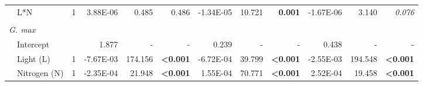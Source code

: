 \begin{landscape}
\begin{table}[]
{\begin{tabular}{p{0.5cm}p{2.5cm}p{0.5cm}p{2cm}p{1.5cm}p{1.5cm}p{2cm}p{1.5cm}p{1.5cm}p{2cm}p{1.5cm}p{1.5cm}}
         & L*N
         & \multicolumn{1}{r}{1}
         & \multicolumn{1}{r}{3.88E-06}
         & \multicolumn{1}{r}{0.485}
         & \multicolumn{1}{r}{0.486}
         & \multicolumn{1}{r}{-1.34E-05}
         & \multicolumn{1}{r}{10.721}
         & \multicolumn{1}{r}{\textbf{0.001}}
         & \multicolumn{1}{r}{-1.67E-06}
         & \multicolumn{1}{r}{3.140}
         & \multicolumn{1}{r}{\textit{0.076}}                 
         \\ &&&&&&&&&& \\ 
         
         \multicolumn{2}{l}{\textit{G. max}} &&&&&&&&&& \\
         & Intercept 
         && \multicolumn{1}{r}{1.877}               
         & \multicolumn{1}{r}{-}                                 
         & \multicolumn{1}{r}{-}                     
         & \multicolumn{1}{r}{0.239}                
         & \multicolumn{1}{r}{-}                                 
         & \multicolumn{1}{r}{-}  
         & \multicolumn{1}{r}{0.438}                
         & \multicolumn{1}{r}{-}                                 
         & \multicolumn{1}{r}{-} \\
         
         & Light (L) 
         & \multicolumn{1}{r}{1}
         & \multicolumn{1}{r}{-7.67E-03}            
         & \multicolumn{1}{r}{174.156}                           
         & \multicolumn{1}{r}{\textbf{\textless{}0.001}}      
         & \multicolumn{1}{r}{-6.72E-04}            
         & \multicolumn{1}{r}{39.799}
         & \multicolumn{1}{r}{\textbf{\textless{}0.001}}
         & \multicolumn{1}{r}{-2.55E-03}
         & \multicolumn{1}{r}{194.548}
         & \textbf{\textless{}0.001} \\
         
         & Nitrogen (N)         
         & \multicolumn{1}{r}{1} 
         & \multicolumn{1}{r}{-2.35E-04}
         & \multicolumn{1}{r}{21.948}
         & \multicolumn{1}{r}{\textbf{\textless{}0.001}}
         & \multicolumn{1}{r}{1.55E-04}
         & \multicolumn{1}{r}{70.771}
         & \multicolumn{1}{r}{\textbf{\textless{}0.001}}
         & \multicolumn{1}{r}{2.52E-04}
         & \multicolumn{1}{r}{19.458}
         & \multicolumn{1}{r}{\textbf{\textless{}0.001}} 
         \\
         

\end{tabular}}
\end{table}
\end{landscape}
